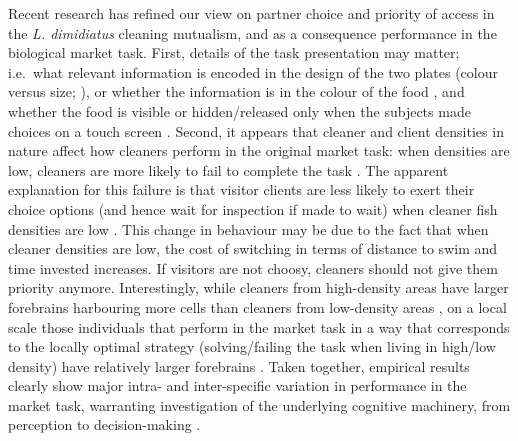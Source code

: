 \documentclass[]{rsos}%
\begin{document}
Recent research has refined our view on partner choice and priority of
access in the \emph{L. dimidiatus} cleaning mutualism, and as a consequence
performance in the biological market task. First, details of the task
presentation may matter; i.e.~what relevant information is encoded in
the design of the two plates (colour versus size;
\citep{wismer_Cuebased_2019}), or whether the information is in the colour of
the food \citep{pretot_Comparative_2021, pretot_Comparing_2016}, and
whether the food is visible or hidden/released only when the subjects
made choices on a touch screen \citep{pretot_Factors_2016}. Second, it
appears that cleaner and client densities in nature affect how cleaners
perform in the original market task: when densities are low, cleaners
are more likely to fail to complete the task \citep{triki_Biological_2019, triki_Decrease_2018, wismer_Variation_2014}. The apparent explanation
for this failure is that visitor clients are less likely to exert their
choice options (and hence wait for inspection if made to wait) when
cleaner fish densities are low \citep{triki_Brain_2020}. This change in
behaviour may be due to the fact that when cleaner densities are low,
the cost of switching in terms of distance to swim and time invested
increases. If visitors are not choosy, cleaners should not give them
priority anymore. Interestingly, while cleaners from high-density areas
have larger forebrains harbouring more cells than cleaners from
low-density areas \citep{triki_Brain_2020}, on a local scale those
individuals that perform in the market task in a way that corresponds to
the locally optimal strategy (solving/failing the task when living in
high/low density) have relatively larger forebrains \citep{triki_Brain_2020}.
Taken together, empirical results clearly show major intra- and
inter-specific variation in performance in the market task, warranting
investigation of the underlying cognitive machinery, from perception to
decision-making \citep{shettleworth_Cognition_2009}.
\end{document}
